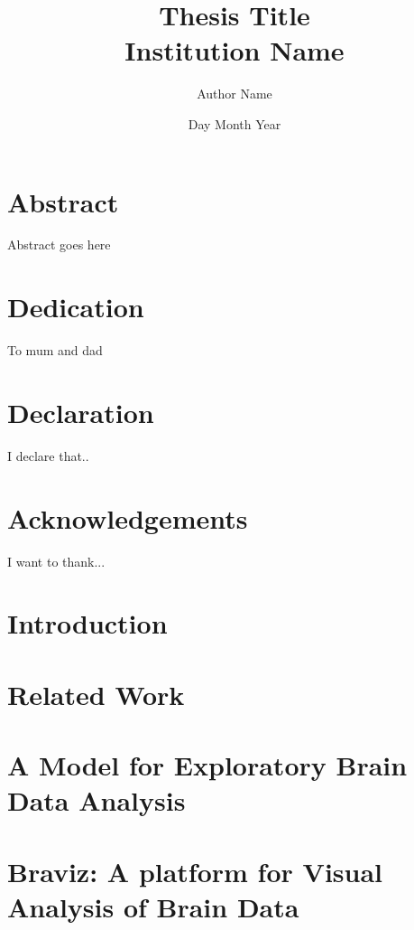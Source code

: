 \documentclass[12pt]{report}
\begin{document}
\title{
	{Thesis Title}\\
	{\large Institution Name}\\
}
\author{Author Name}
\date{Day Month Year}

\maketitle

\chapter*{Abstract}
Abstract goes here

\chapter*{Dedication}
To mum and dad

\chapter*{Declaration}
I declare that..

\chapter*{Acknowledgements}
I want to thank...

\tableofcontents

\chapter{Introduction}
\label{chap_intro}


\chapter{Related Work}
\label{chap_related}


\chapter{A Model for Exploratory Brain Data Analysis}
\label{chap_model}


\chapter{Braviz: A platform for Visual Analysis of Brain Data}
\label{chap_braviz}

\end{document}
